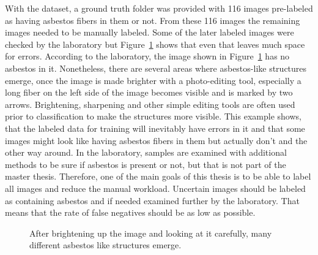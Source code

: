 With the dataset, a ground truth folder was provided with 116 images pre-labeled as having asbestos fibers in them or not. From these 116 images the remaining images needed to be manually labeled. Some of the later labeled images were checked by the laboratory but Figure~\ref{fig:wrong_asbestos_labeling} shows that even that leaves much space for errors.  According to the laboratory, the image shown in Figure~\ref{fig:wrong_asbestos_labeling} has no asbestos in it. Nonetheless, there are several areas where asbestos-like structures emerge, once the image is made brighter with a photo-editing tool, especially a long fiber on the left side of the image becomes visible and is marked by two arrows. Brightening, sharpening and other simple editing tools are often used prior to classification to make the structures more visible. This example shows, that the labeled data for training will inevitably have errors in it and that some images might look like having asbestos fibers in them but actually don't and the other way around. In the laboratory, samples are examined with additional methods to be sure if asbestos is present or not, but that is not part of the master thesis. Therefore, one of the main goals of this thesis is to be able to label all images and reduce the manual workload. Uncertain images should be labeled as containing asbestos and if needed examined further by the laboratory. That means that the rate of false negatives should be as low as possible.

\begin{figure}[h]
\centering
\caption{After brightening up the image and looking at it carefully, many different asbestos like structures emerge.}
\label{fig:wrong_asbestos_labeling}
\end{figure}

